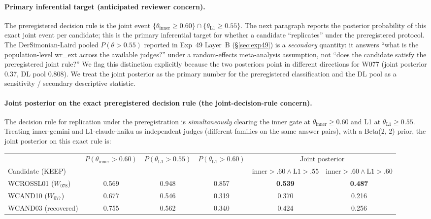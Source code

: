 \documentclass{article}
\begin{document}
\begin{CJK*}{UTF8}{gbsn}
\paragraph{Primary inferential target (anticipated reviewer concern).} The
preregistered decision rule is the joint event
\(\{\theta_{\text{inner}} \geq 0.60\} \cap
\{\theta_{\text{L1}} \geq 0.55\}\). The next paragraph reports
the posterior probability of this exact joint event per
candidate; this is the primary inferential target for whether a
candidate ``replicates'' under the preregistered protocol. The
DerSimonian-Laird pooled \(P(\theta > 0.55)\) reported in
Exp~49 Layer~B (\S\ref{sec:exp49}) is a \emph{secondary}
quantity: it answers ``what is the population-level wr\_ext
across the available judges?'' under a random-effects
meta-analysis assumption, not ``does the candidate satisfy the
preregistered joint rule?'' We flag this distinction explicitly
because the two posteriors point in different directions for
W077 (joint posterior 0.37, DL pool 0.808). We treat the joint
posterior as the primary number for the preregistered
classification and the DL pool as a sensitivity / secondary
descriptive statistic.

\paragraph{Joint posterior on the exact preregistered decision
rule (the joint-decision-rule concern).} The decision rule for replication
under the preregistration is \emph{simultaneously} clearing the
inner gate at \(\theta_{\text{inner}} \geq 0.60\) and L1 at
\(\theta_{\text{L1}} \geq 0.55\). Treating inner-gemini and
L1-claude-haiku as independent judges (different families on the
same answer pairs), with a Beta(2, 2) prior, the joint posterior
on this exact rule is:

\begin{center}\small
\begin{tabular}{l c c c c c}
  \toprule
  & \(P(\theta_{\text{inner}} > 0.60)\) & \(P(\theta_{\text{L1}} > 0.55)\) & \(P(\theta_{\text{L1}} > 0.60)\) & \multicolumn{2}{c}{Joint posterior} \\
  \cmidrule(lr){5-6}
  Candidate (KEEP) & & & & \(\text{inner} {>} .60 \land \text{L1} {>} .55\) & \(\text{inner} {>} .60 \land \text{L1} {>} .60\) \\
  \midrule
  WCROSSL01 (\(W_{078}\)) & 0.569 & 0.948 & 0.857 & \textbf{0.539} & \textbf{0.487} \\
  WCAND10  (\(W_{077}\))  & 0.677 & 0.546 & 0.319 & 0.370          & 0.216 \\
  WCAND03  (recovered)    & 0.755 & 0.562 & 0.340 & 0.424          & 0.256 \\
  \bottomrule
\end{tabular}
\end{center}


\end{CJK*}
\end{document}
